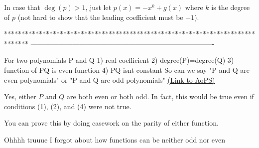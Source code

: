 \begin{solution}
	In case that $\deg (p)>1$, just let $p(x)=-x^k+g(x)$ where $k$ is the degree of $p$ (not hard to show that the leading coefficient must be $-1$).
\end{solution}
*******************************************************************************
-------------------------------------------------------------------------------

\begin{problem}
	For two polynomials P and Q
1) real coefficient
2) degree(P)=degree(Q)
3) function of P\/Q is even function
4) P\/Q isnt constant
So can we say "P and Q are even polynomials" or "P and Q are odd polynomials"
	\flushright \href{https://artofproblemsolving.com/community/c6h1602830}{(Link to AoPS)}
\end{problem}



\begin{solution}
	Yes, either $P$ and $Q$ are both even or both odd. 
In fact, this would be true even if conditions (1), (2), and (4) were not true. 

You can prove this by doing casework on the parity of either function.
\end{solution}






\begin{solution}
	Ohhhh truuue I forgot about how functions can be neither odd nor even 
\end{solution}



